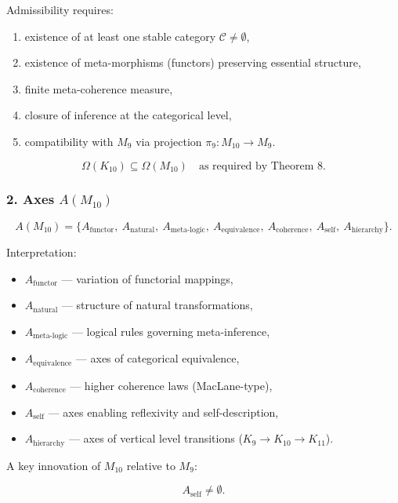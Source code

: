 Admissibility requires:

\begin{enumerate}
    \item existence of at least one stable category $\mathcal{C}\neq\emptyset$,
    \item existence of meta-morphisms (functors) preserving essential structure,
    \item finite meta-coherence measure,
    \item closure of inference at the categorical level,
    \item compatibility with $M_9$ via projection $\pi_{9}:M_{10}\to M_9$.
\end{enumerate}

\[
\Omega(K_{10})\subseteq\Omega(M_{10}) \quad\text{as required by Theorem 8}.
\]

\subsubsection*{2. Axes $A(M_{10})$}

\[
A(M_{10}) =
\{
A_{\mathrm{functor}},\
A_{\mathrm{natural}},\
A_{\mathrm{meta\mbox{-}logic}},\
A_{\mathrm{equivalence}},\
A_{\mathrm{coherence}},\
A_{\mathrm{self}},\
A_{\mathrm{hierarchy}}
\}.
\]

Interpretation:

\begin{itemize}
    \item $A_{\mathrm{functor}}$ — variation of functorial mappings,
    \item $A_{\mathrm{natural}}$ — structure of natural transformations,
    \item $A_{\mathrm{meta\mbox{-}logic}}$ — logical rules governing meta-inference,
    \item $A_{\mathrm{equivalence}}$ — axes of categorical equivalence,
    \item $A_{\mathrm{coherence}}$ — higher coherence laws (MacLane-type),
    \item $A_{\mathrm{self}}$ — axes enabling reflexivity and self-description,
    \item $A_{\mathrm{hierarchy}}$ — axes of vertical level transitions ($K_9\to K_{10}\to K_{11}$).
\end{itemize}

A key innovation of $M_{10}$ relative to $M_9$:

\[
A_{\mathrm{self}} \ne \emptyset.
\]

